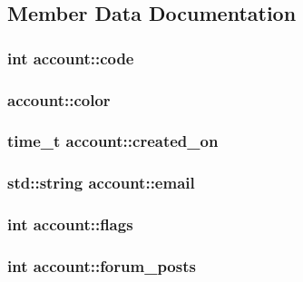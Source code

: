\subsection{Member Data Documentation}
\hypertarget{classaccount_adfc7ed36bceef7a04d39e6ba19bc001c}{
\subsubsection[{code}]{\setlength{\rightskip}{0pt plus 5cm}int account\-::code}}\label{classaccount_adfc7ed36bceef7a04d39e6ba19bc001c}
\hypertarget{classaccount_afcc62d878922a73bb9b4207682ee9308}{
\subsubsection[{color}]{ account\-::color}}\label{classaccount_afcc62d878922a73bb9b4207682ee9308}
\hypertarget{classaccount_a417252386b992dd5fb40e89c03da57c8}{
\subsubsection[{created\-\_\-on}]{\setlength{\rightskip}{0pt plus 5cm}time\-\_\-t account\-::created\-\_\-on}}\label{classaccount_a417252386b992dd5fb40e89c03da57c8}
\hypertarget{classaccount_a4162d542188272c7b0d8fa23f3cd1d8d}{
\subsubsection[{email}]{\setlength{\rightskip}{0pt plus 5cm}std\-::string account\-::email}}\label{classaccount_a4162d542188272c7b0d8fa23f3cd1d8d}
\hypertarget{classaccount_a9a252c3f2ba9386ca20fc3c48bf87f43}{
\subsubsection[{flags}]{\setlength{\rightskip}{0pt plus 5cm}int account\-::flags}}\label{classaccount_a9a252c3f2ba9386ca20fc3c48bf87f43}
\hypertarget{classaccount_acf8a77ab282ed9ba8a45bccf97cd30f8}{
\subsubsection[{forum\-\_\-posts}]{\setlength{\rightskip}{0pt plus 5cm}int account\-::forum\-\_\-posts}}\label{classaccount_acf8a77ab282ed9ba8a45bccf97cd30f8}
